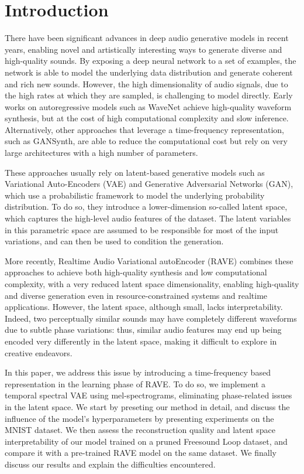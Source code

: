\documentclass{article}
\begin{document}
\section{Introduction}

There have been significant advances in deep audio generative models in recent years, enabling novel and artistically interesting ways to generate diverse and high-quality sounds. By exposing a deep neural network to a set of examples, the network is able to model the underlying data distribution and generate coherent and rich new sounds.
However, the high dimensionality of audio signals, due to the high rates at which they are sampled, is challenging to model directly. Early works on autoregressive models such as WaveNet\cite{oord2016wavenet} achieve high-quality waveform synthesis, but at the cost of high computational complexity and slow inference. Alternatively, other approaches that leverage a time-frequency representation, such as GANSynth\cite{engelGANSynthAdversarialNeural2019}, are able to reduce the computational cost but rely on very large architectures with a high number of parameters.

These approaches usually rely on latent-based generative models such as Variational Auto-Encoders (VAE)\cite{kingmaAutoEncodingVariationalBayes2022} and Generative Adversarial Networks (GAN)\cite{kumarMelGANGenerativeAdversarial2019}, which use a probabilistic framework to model the underlying probability distribution. To do so, they introduce a lower-dimension so-called latent space, which captures the high-level audio features of the dataset. The latent variables in this parametric space are assumed to be responsible for most of the input variations, and can then be used to condition the generation.

More recently, Realtime Audio Variational autoEncoder (RAVE) \cite{caillonRAVEVariationalAutoencoder2021} combines these approaches to achieve both high-quality synthesis and low computational complexity, with a very reduced latent space dimensionality, enabling high-quality and diverse generation even in resource-constrained systems and realtime applications. However, the latent space, although small, lacks interpretability. Indeed, two perceptually similar sounds may have completely different waveforms due to subtle phase variations: thus, similar audio features may end up being encoded very differently in the latent space, making it difficult to explore in creative endeavors.

In this paper, we address this issue by introducing a time-frequency based representation in the learning phase of RAVE. To do so, we implement a temporal spectral VAE using mel-spectrograms, eliminating phase-related issues in the latent space. We start by preseting our method in detail, and discuss the influence of the model's hyperparameters by presenting experiments on the MNIST dataset\cite{lecun2010mnist}. We then assess the reconstruction quality and latent space interpretability of our model trained on a pruned Freesound Loop dataset\cite{ramires2020}, and compare it with a pre-trained RAVE model on the same dataset. We finally discuss our results and explain the difficulties encountered.
\end{document}
